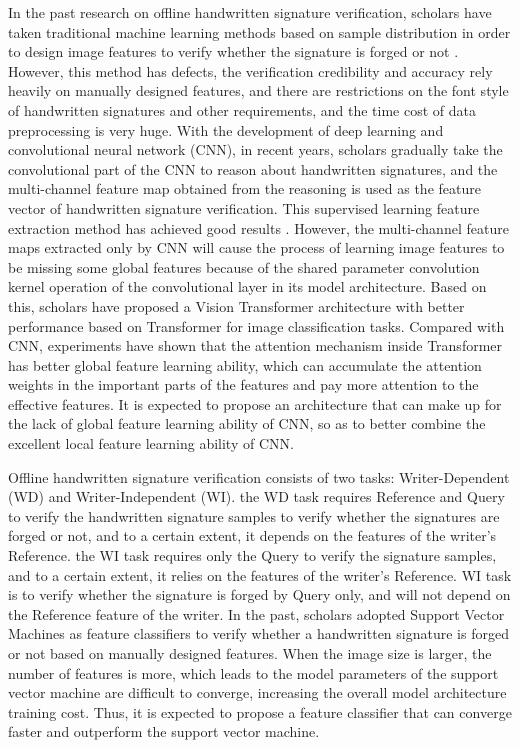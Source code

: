 \documentclass{article}
\begin{document}
In the past research on offline handwritten signature verification, scholars have taken traditional machine learning methods based on sample distribution in order to design image features to verify whether the signature is forged or not \cite{1}. However, this method has defects, the verification credibility and accuracy rely heavily on manually designed features, and there are restrictions on the font style of handwritten signatures and other requirements, and the time cost of data preprocessing is very huge. With the development of deep learning and convolutional neural network (CNN), in recent years, scholars gradually take the convolutional part of the CNN to reason about handwritten signatures, and the multi-channel feature map obtained from the reasoning is used as the feature vector of handwritten signature verification. This supervised learning feature extraction method has achieved good results \cite{2}. However, the multi-channel feature maps extracted only by CNN will cause the process of learning image features to be missing some global features because of the shared parameter convolution kernel operation of the convolutional layer in its model architecture. Based on this, scholars have proposed a Vision Transformer architecture \cite{10} with better performance based on Transformer \cite{9} for image classification tasks. Compared with CNN, experiments have shown that the attention mechanism inside Transformer has better global feature learning ability, which can accumulate the attention weights in the important parts of the features and pay more attention to the effective features. It is expected to propose an architecture that can make up for the lack of global feature learning ability of CNN, so as to better combine the excellent local feature learning ability of CNN.

Offline handwritten signature verification consists of two tasks: Writer-Dependent (WD) and Writer-Independent (WI). the WD task requires Reference and Query to verify the handwritten signature samples to verify whether the signatures are forged or not, and to a certain extent, it depends on the features of the writer's Reference. the WI task requires only the Query to verify the signature samples, and to a certain extent, it relies on the features of the writer's Reference. WI task is to verify whether the signature is forged by Query only, and will not depend on the Reference feature of the writer. In the past, scholars adopted Support Vector Machines as feature classifiers to verify whether a handwritten signature is forged or not based on manually designed features. When the image size is larger, the number of features is more, which leads to the model parameters of the support vector machine are difficult to converge, increasing the overall model architecture training cost. Thus, it is expected to propose a feature classifier that can converge faster and outperform the support vector machine.
\end{document}
